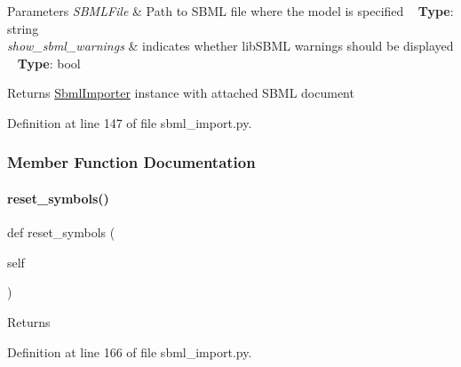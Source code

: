 \begin{DoxyParams}{Parameters}
{\em S\+B\+M\+L\+File} & Path to S\+B\+ML file where the model is specified ~\newline
{\bfseries{Type}}\+: string\\
\hline
{\em show\+\_\+sbml\+\_\+warnings} & indicates whether lib\+S\+B\+ML warnings should be displayed ~\newline
{\bfseries{Type}}\+: bool\\
\hline
\end{DoxyParams}
\begin{DoxyReturn}{Returns}
\mbox{\hyperlink{classamici_1_1sbml__import_1_1_sbml_importer}{Sbml\+Importer}} instance with attached S\+B\+ML document 
\end{DoxyReturn}


Definition at line 147 of file sbml\+\_\+import.\+py.



\subsubsection{Member Function Documentation}
\mbox{\label{classamici_1_1sbml__import_1_1_sbml_importer_a17147ce5084526fa003563813c1be230}} 
\paragraph{\texorpdfstring{reset\_symbols()}{reset\_symbols()}}
{\footnotesize\ttfamily def reset\+\_\+symbols (\begin{DoxyParamCaption}\item[{}]{self }\end{DoxyParamCaption})}

\begin{DoxyReturn}{Returns}

\end{DoxyReturn}


Definition at line 166 of file sbml\+\_\+import.\+py.

